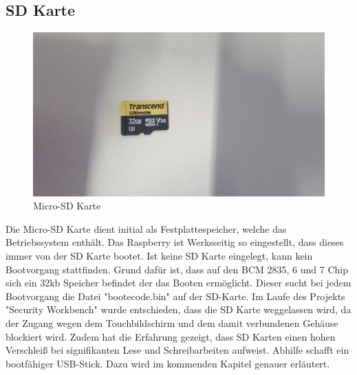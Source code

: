 \subsection{SD Karte}
    	\begin{figure}[H]
		\centering
		\includegraphics[width=1.0\textwidth]{images/raspberry_aufbau/MikroSdCard.jpg}
		\caption{Micro-SD Karte}
	\end{figure}
Die Micro-SD Karte dient initial als Festplattespeicher, welche das Betriebssystem enthält. Das Raspberry ist Werksseitig so eingestellt, dass dieses immer von der SD Karte bootet. Ist keine SD Karte eingelegt, kann kein Bootvorgang stattfinden. Grund dafür ist, dass  auf den BCM 2835, 6 und 7 Chip sich ein 32kb Speicher befindet der das Booten ermöglicht. Dieser sucht bei jedem Bootvorgang die Datei "bootecode.bin" auf der SD-Karte. Im Laufe des Projekts "Security Workbench" wurde entschieden, dass die SD Karte weggelassen wird, da der Zugang wegen dem Touchbildschirm und dem damit verbundenen Gehäuse blockiert wird. Zudem hat die Erfahrung gezeigt, dass SD Karten einen hohen Verschleiß bei signifikanten Lese und Schreibarbeiten aufweist. Abhilfe schafft ein bootfähiger USB-Stick. Dazu wird im kommenden Kapitel genauer erläutert.
 
